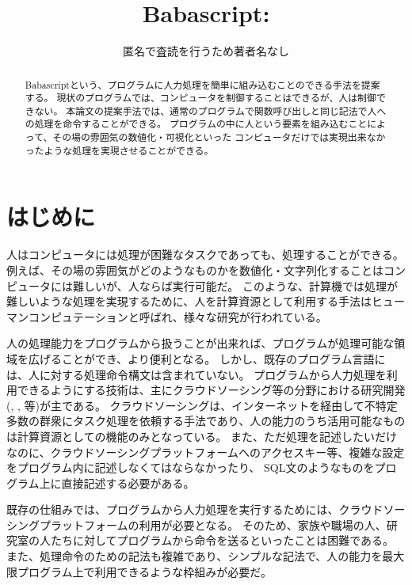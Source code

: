 \title{Babascript: }


\author{匿名で査読を行うため著者名なし
  }

\begin{abstract}

Babascriptという、プログラムに人力処理を簡単に組み込むことのできる手法を提案する。
現状のプログラムでは、コンピュータを制御することはできるが、人は制御できない。
本論文の提案手法では、通常のプログラムで関数呼び出しと同じ記法で人への処理を命令することができる。
プログラムの中に人という要素を組み込むことによって、その場の雰囲気の数値化・可視化といった
コンピュータだけでは実現出来なかったような処理を実現させることができる。

\end{abstract}

\maketitle

\section{はじめに}\label{ux306fux3058ux3081ux306b}

人はコンピュータには処理が困難なタスクであっても、処理することができる。
例えば、その場の雰囲気がどのようなものかを数値化・文字列化することはコンピュータには難しいが、人ならば実行可能だ。
このような、計算機では処理が難しいような処理を実現するために、人を計算資源として利用する手法はヒューマンコンピュテーション\cite{humancomputation}と呼ばれ、様々な研究が行われている。

人の処理能力をプログラムから扱うことが出来れば、プログラムが処理可能な領域を広げることができ、より便利となる。
しかし、既存のプログラム言語には、人に対する処理命令構文は含まれていない。
プログラムから人力処理を利用できるようにする技術は、主にクラウドソーシング等の分野における研究開発(\cite{automan},
\cite{crowddb}, \cite{crowdforge}等)が主である。
クラウドソーシングは、インターネットを経由して不特定多数の群衆にタスク処理を依頼する手法であり、人の能力のうち活用可能なものは計算資源としての機能のみとなっている。
また、ただ処理を記述したいだけなのに、クラウドソーシングプラットフォームへのアクセスキー等、複雑な設定をプログラム内に記述しなくてはならなかったり、
SQL文のようなものをプログラム上に直接記述する必要がある。

既存の仕組みでは、プログラムから人力処理を実行するためには、クラウドソーシングプラットフォームの利用が必要となる。
そのため、家族や職場の人、研究室の人たちに対してプログラムから命令を送るといったことは困難である。
また、処理命令のための記法も複雑であり、シンプルな記法で、人の能力を最大限プログラム上で利用できるような枠組みが必要だ。

